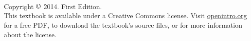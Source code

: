 \chapter*{}
\vfill

\

\noindent Copyright $\copyright$ 2014. First Edition. \\

\noindent This textbook is available under a Creative Commons license. Visit \href{http://www.openintro.org/stat/textbook.php}{openintro.org} for a free PDF, to download the textbook's source files, or for more information about the license. \\


